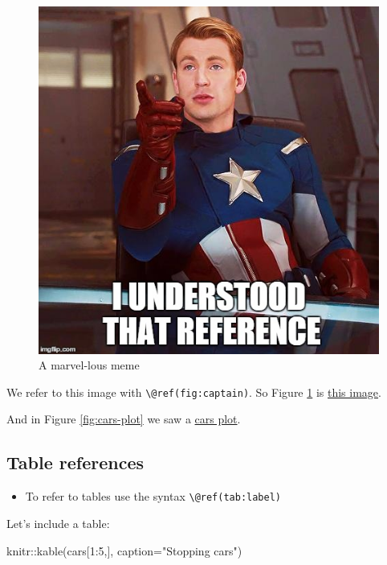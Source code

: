 \documentclass[a4paper, nobind]{templates/ociamthesis}
\providecommand{\tightlist}{%
  \setlength{\itemsep}{0pt}\setlength{\parskip}{0pt}}
\newenvironment{Shaded}{\begin{snugshade}}{\end{snugshade}}
\newcommand{\AttributeTok}[1]{\textcolor[rgb]{0.77,0.63,0.00}{#1}}
\newcommand{\DecValTok}[1]{\textcolor[rgb]{0.00,0.00,0.81}{#1}}
\newcommand{\FunctionTok}[1]{\textcolor[rgb]{0.00,0.00,0.00}{#1}}
\newcommand{\NormalTok}[1]{#1}
\newcommand{\SpecialCharTok}[1]{\textcolor[rgb]{0.00,0.00,0.00}{#1}}
\newcommand{\StringTok}[1]{\textcolor[rgb]{0.31,0.60,0.02}{#1}}
\renewenvironment{Shaded}
{
  \vspace{10pt}%
  \begin{snugshade}%
}{%
  \end{snugshade}%
  \vspace{8pt}%
}
\begin{document}
\begin{figure}

{\centering \includegraphics[width=0.65\linewidth]{figures/sample-content/captain} 

}

\caption{A marvel-lous meme}\label{fig:captain}
\end{figure}

We refer to this image with \texttt{\textbackslash{}@ref(fig:captain)}.
So Figure \ref{fig:captain} is \protect\hyperlink{fig:captain}{this image}.

And in Figure \ref{fig:cars-plot} we saw a \protect\hyperlink{fig:cars-plot}{cars plot}.

\hypertarget{table-references}{%
\subsection{Table references}\label{table-references}}

\begin{itemize}
\tightlist
\item
  To refer to tables use the syntax \texttt{\textbackslash{}@ref(tab:label)}
\end{itemize}

Let's include a table:

\begin{Shaded}
\begin{Highlighting}[]
\NormalTok{knitr}\SpecialCharTok{::}\FunctionTok{kable}\NormalTok{(cars[}\DecValTok{1}\SpecialCharTok{:}\DecValTok{5}\NormalTok{,],}
            \AttributeTok{caption=}\StringTok{"Stopping cars"}\NormalTok{)}
\end{Highlighting}
\end{Shaded}
\end{document}
